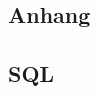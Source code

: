 \documentclass[a4paper,12pt]{article}
\begin{document}
\newpage
\begin{appendix}
\section{Anhang}

\subsection{SQL}



\end{appendix}
\end{document}

